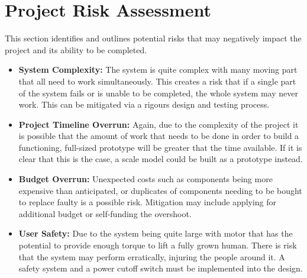 \chapter{Project Risk Assessment}

This section identifies and outlines potential risks that may negatively impact the project and its ability to be completed.

\begin{itemize}    
    \item \textbf{System Complexity:} The system is quite complex with many moving part that all need to work simultaneously. This creates a risk that if a single part of the system fails or is unable to be completed, the whole system may never work. This can be mitigated via a rigours design and testing process.
    
    \item \textbf{Project Timeline Overrun:} Again, due to the complexity of the project it is possible that the amount of work that needs to be done in order to build a functioning, full-sized prototype will be greater that the time available. If it is clear that this is the case, a scale model could be built as a prototype instead.
    
    \item \textbf{Budget Overrun:} Unexpected costs such as components being more expensive than anticipated, or duplicates of components needing to be bought to replace faulty is a possible risk. Mitigation may include applying for additional budget or self-funding the overshoot.
    
    \item \textbf{User Safety:} Due to the system being quite large with motor that has the potential to provide enough torque to lift a fully grown human. There is risk that the system may perform erratically, injuring the people around it. A safety system and a power cutoff switch must be implemented into the design.
    

\end{itemize}



